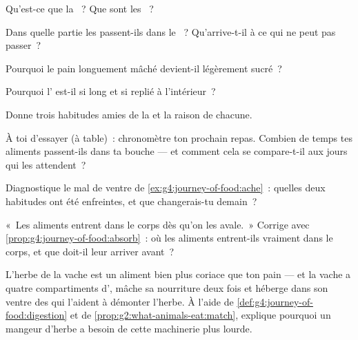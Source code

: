 \begin{exercise}[$\star$]\label{exo:g4:journey-of-food:3}
Qu'est-ce que la ~? Que sont les ~?
\end{exercise}

\begin{exercise}[$\star$]\label{exo:g4:journey-of-food:4}
Dans quelle partie les  passent-ils dans le ~?
Qu'arrive-t-il à ce qui ne peut pas passer~?
\end{exercise}

\begin{exercise}[$\star$]\label{exo:g4:journey-of-food:5}
Pourquoi le pain longuement mâché devient-il légèrement sucré~?
\end{exercise}

\begin{exercise}[$\star$]\label{exo:g4:journey-of-food:6}
Pourquoi l' est-il si long et si replié à l'intérieur~?
\end{exercise}

\begin{exercise}[$\star$]\label{exo:g4:journey-of-food:7}
Donne trois habitudes amies de la  et la raison de chacune.
\end{exercise}

\begin{exercise}[$\star$]\label{exo:g4:journey-of-food:8}
À toi d'essayer (à table)~: chronomètre ton prochain repas. Combien
de temps tes aliments passent-ils dans ta bouche --- et comment cela
se compare-t-il aux jours qui les attendent~?
\end{exercise}

\begin{exercise}[$\star\star$]\label{exo:g4:journey-of-food:9}
Diagnostique le mal de ventre de
\cref{ex:g4:journey-of-food:ache}~: quelles deux habitudes ont été
enfreintes, et que changerais-tu demain~?
\end{exercise}

\begin{exercise}[$\star\star$]\label{exo:g4:journey-of-food:10}
«~Les aliments entrent dans le corps dès qu'on les avale.~» Corrige
avec \cref{prop:g4:journey-of-food:absorb}~: où les aliments
entrent-ils vraiment dans le corps, et que doit-il leur arriver
avant~?
\end{exercise}

\begin{exercise}[$\star\star\star$]\label{exo:g4:journey-of-food:11}
L'herbe de la vache est un aliment bien plus coriace que ton pain
--- et la vache a quatre compartiments d', mâche sa
nourriture deux fois et héberge dans son ventre des 
qui l'aident à démonter l'herbe. À l'aide de
\cref{def:g4:journey-of-food:digestion} et de
\cref{prop:g2:what-animals-eat:match}, explique pourquoi un mangeur
d'herbe a besoin de cette machinerie plus lourde.
\end{exercise}
